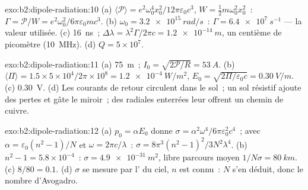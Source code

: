 \begin{solution}{exo:b2:dipole-radiation:10}
(a) $\langle\mathcal P\rangle = e^2\omega_0^4x_0^2/12\pi\varepsilon_0c^3$, $W = \tfrac12m\omega_0^2x_0^2$~:
$\Gamma = \mathcal P/W = e^2\omega_0^2/6\pi\varepsilon_0mc^3$. (b) $\omega_0 = \qty{3.2e15}{rad/s}$~: $\Gamma =
\qty{6.4e7}{s^{-1}}$ --- la valeur utilisée. (c) \qty{16}{ns}~; $\Delta\lambda = \lambda^2\Gamma/2\pi c =
\qty{1.2e-14}{m}$, un centième de picomètre (\qty{10}{MHz}). (d) $Q = 5 \times 10^7$.
\end{solution}

\begin{solution}{exo:b2:dipole-radiation:11}
(a) \qty{75}{m}~; $I_0 = \sqrt{2\mathcal P/R} = \qty{53}{A}$. (b) $\langle\Pi\rangle = 1.5 \times
5 \times 10^4/2\pi \times 10^8 = \qty{1.2e-4}{W/m^2}$, $E_0 = \sqrt{2\Pi/\varepsilon_0c} = \qty{0.30}{V/m}$.
(c) \qty{0.30}{V}. (d) Les courants de retour circulent dans le sol~; un sol résistif
ajoute des pertes et gâte le miroir~; des radiales enterrées leur offrent un
chemin de cuivre.
\end{solution}

\begin{solution}{exo:b2:dipole-radiation:12}
(a) $p_0 = \alpha E_0$ donne $\sigma = \alpha^2\omega^4/6\pi\varepsilon_0^2c^4$~; avec $\alpha = \varepsilon_0(n^2
- 1)/N$ et $\omega = 2\pi c/\lambda$~: $\sigma = 8\pi^3(n^2 - 1)^2/3N^2\lambda^4$. (b) $n^2 - 1 =
5.8 \times 10^{-4}$~: $\sigma = \qty{4.9e-31}{m^2}$, libre parcours moyen $1/N\sigma = \qty{80}{km}$. (c)
$8/80 = 0.1$. (d) $\sigma$ se mesure par l' du ciel, $n$ est
connu~: $N$ s'en déduit, donc le nombre d'Avogadro.
\end{solution}

